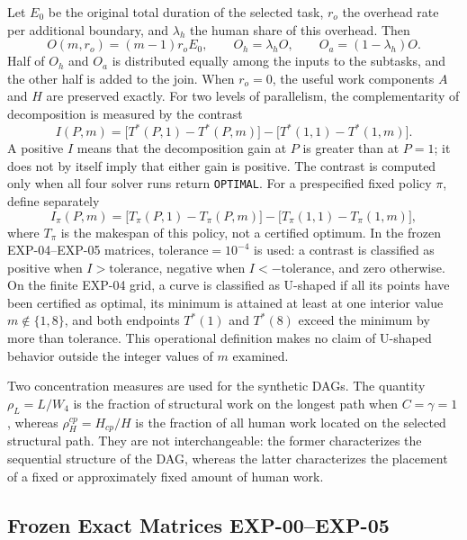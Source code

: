 Let $E_0$ be the original total duration of the selected task, $r_o$ the
overhead rate per additional boundary, and $\lambda_h$ the human share of this
overhead. Then
\[
  O(m,r_o)=(m-1)r_oE_0,\qquad
  O_h=\lambda_hO,\qquad O_a=(1-\lambda_h)O.
\]
Half of $O_h$ and $O_a$ is distributed equally among the inputs to the subtasks,
and the other half is added to the join. When $r_o=0$, the useful work components
$A$ and $H$ are preserved exactly. For two levels of parallelism, the complementarity
of decomposition is measured by the contrast
\begin{equation}
  I(P,m)=\bigl[T^*(P,1)-T^*(P,m)\bigr]
  -\bigl[T^*(1,1)-T^*(1,m)\bigr].
  \label{eq:interaction-contrast}
\end{equation}
A positive $I$ means that the decomposition gain at $P$ is greater than at
$P=1$; it does not by itself imply that either gain is positive. The contrast is
computed only when all four solver runs return \texttt{OPTIMAL}. For a
prespecified fixed policy $\pi$, define separately
\[
  I_{\pi}(P,m)=\bigl[T_{\pi}(P,1)-T_{\pi}(P,m)\bigr]
  -\bigl[T_{\pi}(1,1)-T_{\pi}(1,m)\bigr],
\]
where $T_{\pi}$ is the makespan of this policy, not a certified optimum. In the
frozen EXP-04--EXP-05 matrices, $\mathrm{tolerance}=10^{-4}$ is used: a contrast
is classified as positive when $I>\mathrm{tolerance}$, negative when
$I<-\mathrm{tolerance}$, and zero otherwise. On the finite EXP-04 grid, a curve
is classified as U-shaped if all its points have been certified as optimal, its
minimum is attained at least at one interior value $m\notin\{1,8\}$, and both
endpoints $T^*(1)$ and $T^*(8)$ exceed the minimum by more than
$\mathrm{tolerance}$. This operational definition makes no claim of U-shaped
behavior outside the integer values of $m$ examined.

Two concentration measures are used for the synthetic DAGs. The quantity
$\rho_L=L/W_4$ is the fraction of structural work on the longest path when
$C=\gamma=1$, whereas $\rho_H^{cp}=H_{cp}/H$ is the fraction of all human work
located on the selected structural path. They are not interchangeable: the
former characterizes the sequential structure of the DAG, whereas the latter
characterizes the placement of a fixed or approximately fixed amount of human
work.

\subsection{Frozen Exact Matrices EXP-00--EXP-05}

